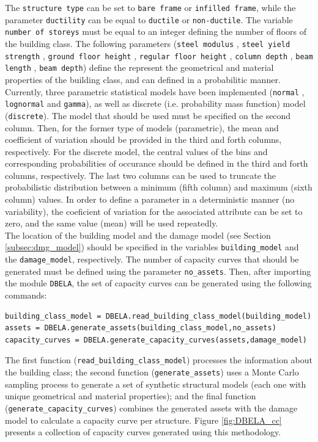 The \verb=structure type= can be set to \verb=bare frame= or \verb=infilled frame=, while the parameter \verb=ductility= can be equal to \verb=ductile= or \verb=non-ductile=. The variable \verb=number of storeys= must be equal to an integer defining the number of floors of the building class. The following parameters (\verb=steel modulus= , \verb=steel yield strength= , \verb=ground floor height= , \verb=regular floor height= , \verb=column depth= , \verb=beam length= , \verb=beam depth=) define the represent the geometrical and material properties of the building class, and can defined in a probabilitic manner. Currently, three parametric statistical models have been implemented (\verb=normal= , \verb=lognormal= and \verb=gamma=), as well as discrete (i.e. probability mass function) model (\verb=discrete=). The model that should be used must be specified on the second column. Then, for the former type of models (parametric), the mean and coefficient of variation should be provided in the third and forth columns, respectively. For the discrete model, the central values of the bins and corresponding probabilities of occurance should be defined in the third and forth columns, respectively. The last two columns can be used to truncate the probabilistic distribution between a minimum (fifth column) and maximum (sixth column) values. In order to define a parameter in a deterministic manner (no variability), the coeficient of variation for the associated attribute can be set to zero, and the same value (mean) will be used repeatedly.\\

The location of the building model and the damage model (see Section \ref{subsec:dmg_model}) should be specified in the variables \verb=building_model= and the \verb=damage_model=, respectively. The number of capacity curves that should be generated must be defined using the parameter \verb=no_assets=. Then, after importing the module \verb=DBELA=, the set of capacity curves can be generated using the following commands:

\begin{Verbatim}[frame=single, commandchars=\\\{\}, samepage=true]
building_class_model = DBELA.read_building_class_model(building_model)
assets = DBELA.generate_assets(building_class_model,no_assets)
capacity_curves = DBELA.generate_capacity_curves(assets,damage_model)
\end{Verbatim}

The first function (\verb=read_building_class_model=) processes the information about the building class; the second function (\verb=generate_assets=) uses a Monte Carlo sampling process to generate a set of synthetic structural models (each one with unique geometrical and material properties); and the final function (\verb=generate_capacity_curves=) combines the generated assets with the damage model to calculate a capacity curve per structure. Figure \ref{fig:DBELA_cc} presents a collection of capacity curves generated using this methodology.

